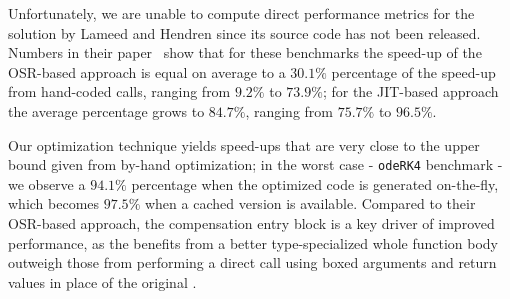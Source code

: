 Unfortunately, we are unable to compute direct performance metrics for the solution by Lameed and Hendren since its source code has not been released. Numbers in their paper~\cite{lameed2013feval} show that for these benchmarks the speed-up of the OSR-based approach is equal on average to a $30.1\%$ percentage of the speed-up from hand-coded calls, ranging from $9.2\%$ to $73.9\%$; for the JIT-based approach the average percentage grows to $84.7\%$, ranging from $75.7\%$ to $96.5\%$.

Our optimization technique yields speed-ups that are very close to the upper bound given from by-hand optimization; in the worst case - {\tt odeRK4} benchmark - we observe a $94.1\%$ percentage when the optimized code is generated on-the-fly, which becomes $97.5\%$ when a cached version is available. Compared to their OSR-based approach, the compensation entry block is a key driver of improved performance, as the benefits from a better type-specialized whole function body outweigh those from performing a direct call using boxed arguments and return values in place of the original \feval.
